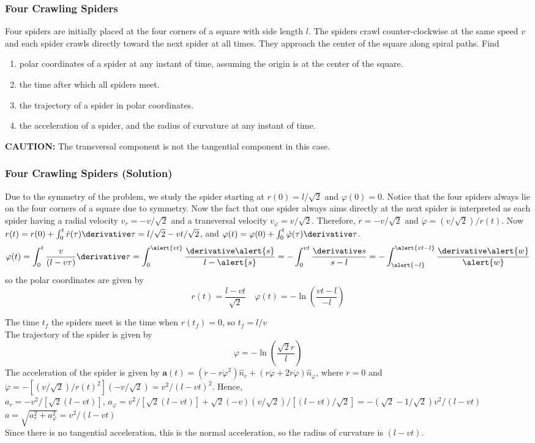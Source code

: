 \begin{frame}
\frametitle{Four Crawling Spiders}
\alert{Four} spiders are initially placed at the four corners of a \alert{square} with side length $l$. The spiders crawl counter-clockwise at the \alert{same speed} $v$ and each spider crawls \alert{directly} toward the next spider at all times. They approach the center of the square along spiral paths. Find
\begin{enumerate}
\item{\alert{polar coordinates} of a spider at any instant of time, assuming the origin is at the center of the square.}
\item{the \alert{time} after which all spiders meet.}
\item{the \alert{trajectory} of a spider in polar coordinates.}
\item{the \alert{acceleration} of a spider, and the \alert{radius of curvature} at any instant of time.}
\end{enumerate}
\textbf{CAUTION:} The \alert{transversal} component is not the \alert{tangential} component in this case.
\end{frame}
\begin{frame}
\frametitle{Four Crawling Spiders (Solution)}
Due to the \alert{symmetry} of the problem, we study the spider starting at $r(0)=l/\sqrt{2}$ and $\varphi(0)=0$. \alert{Notice} that the four spiders always lie on the four corners of a square due to \alert{symmetry}. Now the fact that one spider always aims \alert{directly} at the next spider is interpreted as each spider having a \alert{radial} velocity $v_r=-v/\sqrt{2}$ and a \alert{transversal} velocity $v_\varphi=v/\sqrt{2}$. Therefore, $\dot r=-v/\sqrt{2}$ and $\dot\varphi=(v/\sqrt{2})/r(t)$. Now $r(t)=r(0)+\int_0^t \dot r(\tau)\derivative\tau=l/\sqrt{2}-vt/\sqrt{2}$, and $\varphi(t)=\varphi(0)+\int_0^t\dot\varphi(\tau)\derivative\tau$.
\[\varphi(t)=\int_0^t\frac{v}{(l-v\tau)}\derivative\tau=\int_0^{\alert{vt}}\frac{\derivative \alert{s}}{l-\alert{s}}=-\int_0^{vt}\frac{\derivative s}{s-l}=-\int_{\alert{-l}}^{\alert{vt-l}}\frac{\derivative \alert{w}}{\alert{w}}\]
so the \alert{polar coordinates} are given by \[r(t)=\frac{l-vt}{\sqrt{2}}\quad \varphi(t)=-\ln\left(\frac{vt-l}{-l}\right)\]
\end{frame}
\begin{frame}
The \alert{time} $t_f$ the spiders meet is the time when $r(t_f)=0$, so $t_f=l/v$\\The \alert{trajectory} of the spider is given by
\[
\varphi=-\ln\left(\frac{\sqrt{2}r}{l}\right)
\]
The \alert{acceleration} of the spider is given by $\mathbf{a}(t)=(\ddot{r}-r\dot\varphi^2)\hat{n}_r+(r\ddot \varphi+2\dot r\dot\varphi)\hat n_\varphi$, where $\ddot r=0$ and $\ddot\varphi=-[(v/\sqrt{2})/r(t)^2] (-v/\sqrt{2})=v^2/(l-vt)^2$. Hence,\\
$a_r=-v^2/[\sqrt{2}(l-vt)]$, \quad $a_\varphi=v^2/[\sqrt{2}(l-vt)]+\sqrt{2}(-v)(v/\sqrt{2})/[(l-vt)/\sqrt{2}]=-(\sqrt{2}-1/\sqrt{2})v^2/(l-vt)$\\
$a=\sqrt{a_r^2+a_\varphi^2}=v^2/(l-vt)$\\
Since there is no \alert{tangential} acceleration, this is the normal acceleration, so the \alert{radius of curvature} is $(l-vt)$.
\end{frame}
